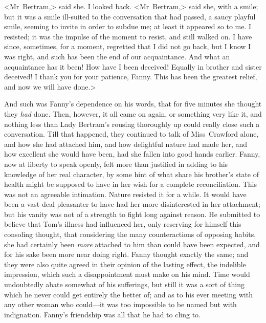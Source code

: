 <Mr~Bertram,> said she. I looked back. <Mr~Bertram,> said she, with a smile; but it was a smile ill-suited to the conversation that had passed, a saucy playful smile, seeming to invite in order to subdue me; at least it appeared so to me. I resisted; it was the impulse of the moment to resist, and still walked on. I have since, sometimes, for a moment, regretted that I did not go back, but I know I was right, and such has been the end of our acquaintance. And what an acquaintance has it been! How have I been deceived! Equally in brother and sister deceived! I thank you for your patience, Fanny. This has been the greatest relief, and now we will have done.>

And such was Fanny's dependence on his words, that for five minutes she thought they \textit{had}  done. Then, however, it all came on again, or something very like it, and nothing less than Lady Bertram's rousing thoroughly up could really close such a conversation. Till that happened, they continued to talk of Miss~Crawford alone, and how she had attached him, and how delightful nature had made her, and how excellent she would have been, had she fallen into good hands earlier. Fanny, now at liberty to speak openly, felt more than justified in adding to his knowledge of her real character, by some hint of what share his brother's state of health might be supposed to have in her wish for a complete reconciliation. This was not an agreeable intimation. Nature resisted it for a while. It would have been a vast deal pleasanter to have had her more disinterested in her attachment; but his vanity was not of a strength to fight long against reason. He submitted to believe that Tom's illness had influenced her, only reserving for himself this consoling thought, that considering the many counteractions of opposing habits, she had certainly been \textit{more}  attached to him than could have been expected, and for his sake been more near doing right. Fanny thought exactly the same; and they were also quite agreed in their opinion of the lasting effect, the indelible impression, which such a disappointment must make on his mind. Time would undoubtedly abate somewhat of his sufferings, but still it was a sort of thing which he never could get entirely the better of; and as to his ever meeting with any other woman who could—it was too impossible to be named but with indignation. Fanny's friendship was all that he had to cling to. 
